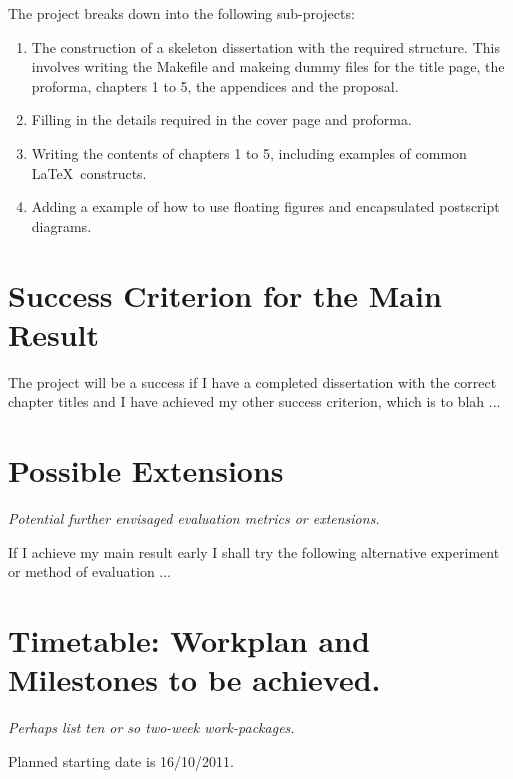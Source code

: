 The project breaks down into the following sub-projects:

\begin{enumerate}

\item The construction of a skeleton dissertation with the required 
structure. This involves writing the Makefile and makeing dummy files
for the title page, the proforma, chapters 1 to 5, the appendices and
the proposal.

\item Filling in the details required in the cover page and proforma.

\item Writing the contents of chapters 1 to 5, including examples
of common \LaTeX\ constructs.

\item Adding a example of how to use floating figures and encapsulated
postscript diagrams.

\end{enumerate}

\section*{Success Criterion for the Main Result}


The project will be a success if I have a completed dissertation with the correct chapter
titles and I have achieved my other success criterion, which is to blah ...



\section*{Possible Extensions}

{\em Potential further envisaged evaluation metrics or extensions.}

If I achieve my main result early I shall try the following alternative experiment or method of evaluation ...


\section*{Timetable: Workplan and Milestones to be achieved.}


{\em Perhaps list ten or so  two-week work-packages.}

Planned starting date is 16/10/2011.

